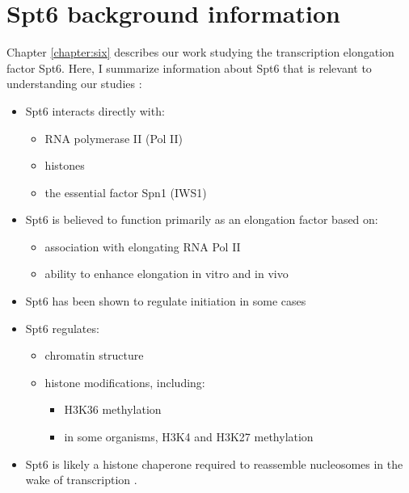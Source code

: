 \section{Spt6 background information}

Chapter \ref{chapter:six} describes our work studying the transcription elongation factor Spt6.
Here, I summarize information about Spt6 that is relevant to understanding our studies \citep{doris2018}:

\begin{itemize}[nosep, topsep=.5em]
\item Spt6 interacts directly with:
	\begin{itemize}[nosep]
	\item RNA polymerase II (Pol II) \citep{close2011, diebold2011, liu2011, sdano2017, sun2010, yoh2007}
	\item histones \citep{bortvin1996, mccullough2015}
	\item the essential factor Spn1 (IWS1) \citep{diebold2010b, li2018, mcdonald2010}
	\end{itemize}
\item Spt6 is believed to function primarily as an elongation factor based on:
	\begin{itemize}[nosep]
	\item association with elongating RNA Pol II \citep{andrulis2000, ivanovska2011, kaplan2000, mayer2010}
	\item ability to enhance elongation in vitro \citep{endoh2004} and in vivo \citep{ardehali2009}
	\end{itemize}
\item Spt6 has been shown to regulate initiation in some cases \citep{adkins2006, ivanovska2011}
\item Spt6 regulates:
	\begin{itemize}[nosep]
	\item chromatin structure \citep{bortvin1996, degennaro2013, ivanovska2011, jeronimo2015, kaplan2003, perales2013, vanbakel2013}
	\item histone modifications, including:
		\begin{itemize}[nosep]
		\item H3K36 methylation \citep{carrozza2005, chu2006, yoh2008, youdell2008}
		\item in some organisms, H3K4 and H3K27 methylation \citep{begum2012, chen2012, degennaro2013, wang2017, wang2013}
		\end{itemize}
	\end{itemize}
\item Spt6 is likely a histone chaperone required to reassemble nucleosomes in the wake of transcription \citep{duina2011}.
\end{itemize}

